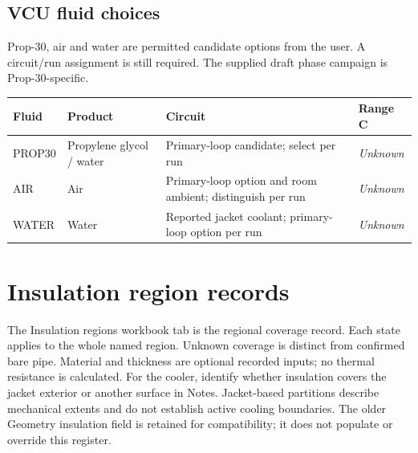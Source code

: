 \documentclass[11pt]{article}
\begin{document}
\subsection*{VCU fluid choices}
Prop-30, air and water are permitted candidate options from the user. A circuit/run assignment is still required. The supplied draft phase campaign is Prop-30-specific.
\small\setlength{\tabcolsep}{4pt}
\begin{longtable}{>{\raggedright\arraybackslash}p{}>{\raggedright\arraybackslash}p{}>{\raggedright\arraybackslash}p{}>{\raggedright\arraybackslash}p{}}
\toprule
\textbf{Fluid} & \textbf{Product} & \textbf{Circuit} & \textbf{Range C} \\\midrule\endhead
PROP30 & Propylene glycol / water & Primary-loop candidate; select per run & \textit{Unknown} \\[3pt]
AIR & Air & Primary-loop option and room ambient; distinguish per run & \textit{Unknown} \\[3pt]
WATER & Water & Reported jacket coolant; primary-loop option per run & \textit{Unknown} \\[3pt]
\bottomrule\end{longtable}\normalsize
\clearpage\section{Insulation region records}\label{insulation-detail}
The Insulation regions workbook tab is the regional coverage record. Each state applies to the whole named region. Unknown coverage is distinct from confirmed bare pipe. Material and thickness are optional recorded inputs; no thermal resistance is calculated.
For the cooler, identify whether insulation covers the jacket exterior or another surface in Notes. Jacket-based partitions describe mechanical extents and do not establish active cooling boundaries. The older Geometry insulation field is retained for compatibility; it does not populate or override this register.
\end{document}
